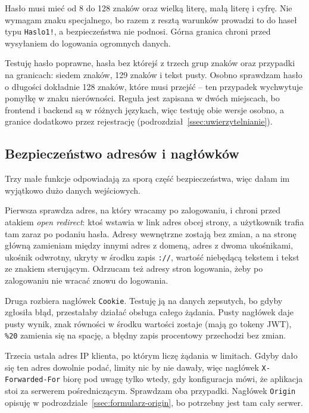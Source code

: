Hasło musi mieć od 8 do 128 znaków oraz wielką literę, małą literę i cyfrę. Nie wymagam znaku specjalnego, bo razem z resztą warunków prowadzi to do haseł typu \texttt{Haslo1!}, a bezpieczeństwa nie podnosi. Górna granica chroni przed wysyłaniem do logowania ogromnych danych.

Testuję hasło poprawne, hasła bez którejś z trzech grup znaków oraz przypadki na granicach: siedem znaków, 129 znaków i tekst pusty. Osobno sprawdzam hasło o długości dokładnie 128 znaków, które musi przejść -- ten przypadek wychwytuje pomyłkę w znaku nierówności. Reguła jest zapisana w dwóch miejscach, bo frontend i backend są w różnych językach, więc testuję obie wersje osobno, a granice dodatkowo przez rejestrację (podrozdział~\ref{ssec:uwierzytelnianie}).

\subsection{Bezpieczeństwo adresów i nagłówków}
\label{ssec:warstwa-transportowa}

Trzy małe funkcje odpowiadają za sporą część bezpieczeństwa, więc dałam im wyjątkowo dużo danych wejściowych.

Pierwsza sprawdza adres, na który wracamy po zalogowaniu, i chroni przed atakiem \textit{open redirect}: ktoś wstawia w link adres obcej strony, a użytkownik trafia tam zaraz po podaniu hasła. Adresy wewnętrzne zostają bez zmian, a na stronę główną zamieniam między innymi adres z domeną, adres z dwoma ukośnikami, ukośnik odwrotny, ukryty w środku zapis \texttt{://}, wartość niebędącą tekstem i tekst ze znakiem sterującym. Odrzucam też adresy stron logowania, żeby po zalogowaniu nie wracać znowu do logowania.

Druga rozbiera nagłówek \texttt{Cookie}. Testuję ją na danych zepsutych, bo gdyby zgłosiła błąd, przestałaby działać obsługa całego żądania. Pusty nagłówek daje pusty wynik, znak równości w środku wartości zostaje (mają go tokeny JWT), \texttt{\%20} zamienia się na spację, a błędny zapis procentowy przechodzi bez zmian.

Trzecia ustala adres IP klienta, po którym liczę żądania w limitach. Gdyby dało się ten adres dowolnie podać, limity nic by nie dawały, więc nagłówek \texttt{X-Forwarded-For} biorę pod uwagę tylko wtedy, gdy konfiguracja mówi, że aplikacja stoi za serwerem pośredniczącym. Sprawdzam oba przypadki. Nagłówek \texttt{Origin} opisuję w podrozdziale~\ref{ssec:formularz-origin}, bo potrzebny jest tam cały serwer.

